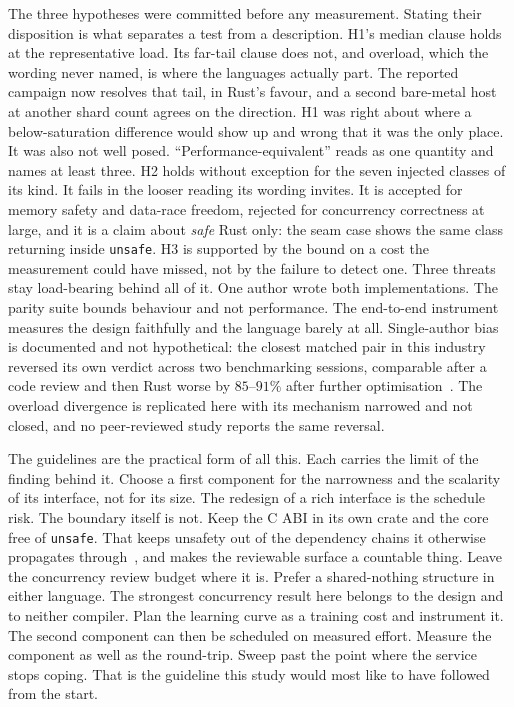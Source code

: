 \documentclass[english,twoside,openright,a4paper,censored,csm,software-track-2020]{HYthesisML}
\begin{document}
The three hypotheses were committed before any measurement. Stating their disposition is
what separates a test from a description. H1's median clause holds at the representative load. Its far-tail clause does not, and
overload, which the wording never named, is where the languages actually part. The
reported campaign now resolves that tail, in Rust's favour, and a second bare-metal host at
another shard count agrees on the direction. H1 was right about where a below-saturation
difference would show up and wrong that it was the only place. It was also not well posed.
``Performance-equivalent'' reads as one quantity and names at least three. H2 holds
without exception for the seven injected classes of its kind. It fails in the looser
reading its wording invites. It is accepted for memory safety and data-race freedom,
rejected for concurrency correctness at large, and it is a claim about \emph{safe} Rust
only: the seam case shows the same class returning inside \texttt{unsafe}. H3 is supported by the bound on a cost the
measurement could have missed, not by the failure to detect one. Three threats stay
load-bearing behind all of it. One author wrote both implementations. The parity suite
bounds behaviour and not performance. The end-to-end instrument
measures the design faithfully and the language barely at all. Single-author bias is
documented and not hypothetical: the closest matched pair in this industry reversed
its own verdict across two benchmarking sessions, comparable after a code review and then
Rust worse by $85$--$91\%$ after further optimisation~\cite{emberg2023asn1}. The overload divergence
is replicated here with its mechanism narrowed and not closed, and no peer-reviewed study
reports the same reversal.

The guidelines are the practical form of all this. Each carries the limit of the
finding behind it. Choose a first component for the narrowness and the scalarity of its
interface, not for its size. The redesign of a rich interface is the schedule risk. The
boundary itself is not. Keep the C ABI in its own crate and the core free of
\texttt{unsafe}. That keeps unsafety out of the dependency chains it otherwise propagates
through~\cite{evans2020rust}, and makes the reviewable surface a countable thing. Leave
the concurrency review budget where it is. Prefer a
shared-nothing structure in either language. The strongest concurrency result here
belongs to the design and to neither compiler. Plan the learning curve as a training
cost and instrument it. The second component can then be scheduled on measured effort.
Measure the component as well as the round-trip. Sweep past the point where the service
stops coping. That is the guideline this study would most like to have followed from the
start.
\end{document}

